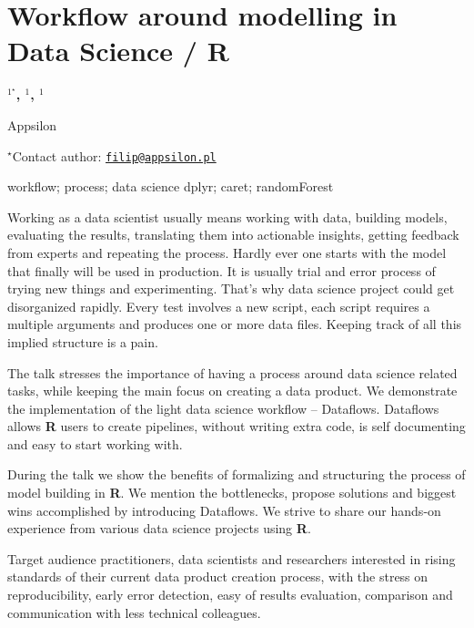 \documentclass[\main/boa.tex]{subfiles}
\begin{document}
\section{Workflow around modelling in Data Science / R}

\begin{center}
  {\bf {}$^{1^\star}$, $^{1}$, $^{1}$}
\end{center}

\vskip 0.3cm

\begin{affiliations}
\begin{enumerate}
\begin{minipage}{0.915\textwidth}
\centering
\item Appsilon \\[-2pt]
\end{minipage}
\end{enumerate}
$^\star$Contact author: \href{mailto:filip@appsilon.pl}{\nolinkurl{filip@appsilon.pl}}\\
\end{affiliations}

\vskip 0.5cm

\begin{minipage}{0.915\textwidth}
\keywords workflow; process; data science
\packages dplyr; caret; randomForest
\end{minipage}

\vskip 0.8cm

Working as a data scientist usually means working with data, building
models, evaluating the results, translating them into actionable
insights, getting feedback from experts and repeating the process.
Hardly ever one starts with the model that finally will be used in
production. It is usually trial and error process of trying new things
and experimenting. That's why data science project could get
disorganized rapidly. Every test involves a new script, each script
requires a multiple arguments and produces one or more data files.
Keeping track of all this implied structure is a pain.

The talk stresses the importance of having a process around data science
related tasks, while keeping the main focus on creating a data product.
We demonstrate the implementation of the light data science workflow --
Dataflows. Dataflows allows \textbf{R} users to create pipelines,
without writing extra code, is self documenting and easy to start
working with.

During the talk we show the benefits of formalizing and structuring the
process of model building in \textbf{R}. We mention the bottlenecks,
propose solutions and biggest wins accomplished by introducing
Dataflows. We strive to share our hands-on experience from various data
science projects using \textbf{R}.

Target audience practitioners, data scientists and researchers
interested in rising standards of their current data product creation
process, with the stress on reproducibility, early error detection, easy
of results evaluation, comparison and communication with less technical
colleagues.
\end{document}
